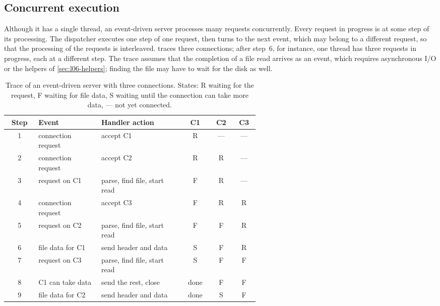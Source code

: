 \documentclass[../main.tex]{subfiles}
\begin{document}
\subsection{Concurrent execution}

Although it has a single thread, an event-driven server processes many
requests concurrently.  Every request in progress is at some step of its
processing.  The dispatcher executes one step of one request, then turns to
the next event, which may belong to a different request, so that the
processing of the requests is interleaved.   traces
three connections; after step~6, for instance, one thread has three
requests in progress, each at a different step.  The trace assumes that the
completion of a file read arrives as an event, which requires asynchronous
I/O or the helpers of \cref{sec:l06-helpers}; finding the file may have to
wait for the disk as well.

\begin{table}[htbp]
  \centering
  \caption{Trace of an event-driven server with three connections.  States:
    R waiting for the request, F waiting for file data, S waiting until
    the connection can take more data, --- not yet connected.}
  \label{tab:l06-trace}
  \small
  \begin{tabular}{@{}c>{\raggedright\arraybackslash}p{0.25\linewidth}>{\raggedright\arraybackslash}p{0.33\linewidth}ccc@{}}
    \toprule
    Step & Event & Handler action & C1 & C2 & C3 \\
    \midrule
    1 & connection request & accept C1 & R & --- & --- \\
    2 & connection request & accept C2 & R & R & --- \\
    3 & request on C1 & parse, find file, start read & F & R & --- \\
    4 & connection request & accept C3 & F & R & R \\
    5 & request on C2 & parse, find file, start read & F & F & R \\
    6 & file data for C1 & send header and data & S & F & R \\
    7 & request on C3 & parse, find file, start read & S & F & F \\
    8 & C1 can take data & send the rest, close & done & F & F \\
    9 & file data for C2 & send header and data & done & S & F \\
    \bottomrule
  \end{tabular}
\end{table}
\end{document}

